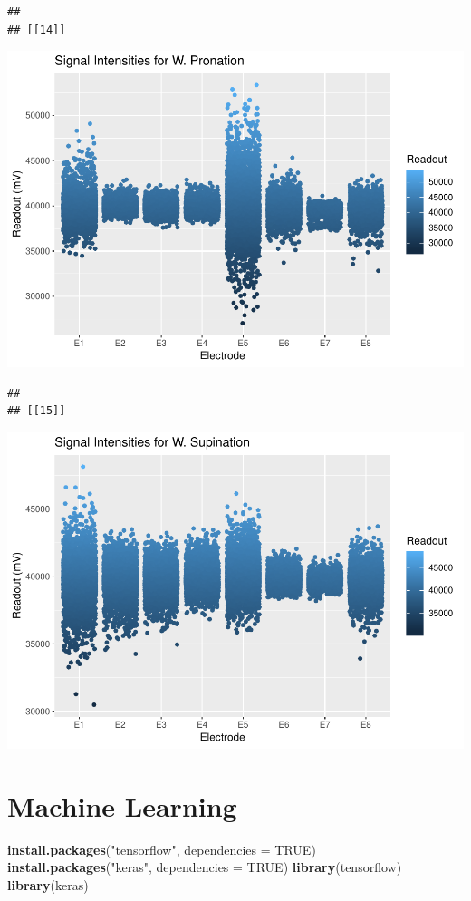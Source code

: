 \documentclass[]{article}
\newenvironment{Shaded}{\begin{snugshade}}{\end{snugshade}}
\newcommand{\KeywordTok}[1]{\textcolor[rgb]{0.13,0.29,0.53}{\textbf{#1}}}
\newcommand{\DataTypeTok}[1]{\textcolor[rgb]{0.13,0.29,0.53}{#1}}
\newcommand{\StringTok}[1]{\textcolor[rgb]{0.31,0.60,0.02}{#1}}
\newcommand{\OtherTok}[1]{\textcolor[rgb]{0.56,0.35,0.01}{#1}}
\newcommand{\NormalTok}[1]{#1}
\begin{document}
\begin{verbatim}
## 
## [[14]]
\end{verbatim}

\includegraphics{Megahand_files/figure-latex/unnamed-chunk-5-14.pdf}

\begin{verbatim}
## 
## [[15]]
\end{verbatim}

\includegraphics{Megahand_files/figure-latex/unnamed-chunk-5-15.pdf}

\section{Machine Learning}\label{machine-learning}

\begin{Shaded}
\begin{Highlighting}[]
\KeywordTok{install.packages}\NormalTok{(}\StringTok{"tensorflow"}\NormalTok{, }\DataTypeTok{dependencies =} \OtherTok{TRUE}\NormalTok{)}
\KeywordTok{install.packages}\NormalTok{(}\StringTok{"keras"}\NormalTok{, }\DataTypeTok{dependencies =} \OtherTok{TRUE}\NormalTok{)}
\KeywordTok{library}\NormalTok{(tensorflow)}
\KeywordTok{library}\NormalTok{(keras)}
\end{Highlighting}
\end{Shaded}
\end{document}
